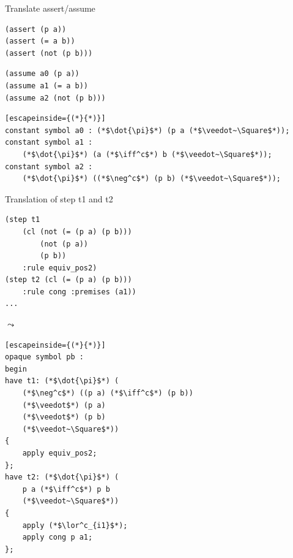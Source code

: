 \documentclass[aspectratio=169,xcolor={dvipsnames}]{beamer}
\begin{document}
\begin{frame}[fragile]{Translate assert/assume}
\noindent\begin{minipage}{.40\textwidth}
\begin{verbatim}
(assert (p a))
(assert (= a b))
(assert (not (p b)))
\end{verbatim}
\end{minipage}
\newline
\noindent\begin{minipage}{.40\textwidth}
\begin{verbatim}
(assume a0 (p a))
(assume a1 (= a b))
(assume a2 (not (p b)))
\end{verbatim}
\end{minipage}
\hfill\begin{minipage}{.55\textwidth}
\begin{lstlisting}[escapeinside={(*}{*)}]
constant symbol a0 : (*$\dot{\pi}$*) (p a (*$\veedot~\Square$*));
constant symbol a1 :
    (*$\dot{\pi}$*) (a (*$\iff^c$*) b (*$\veedot~\Square$*));
constant symbol a2 :
    (*$\dot{\pi}$*) ((*$\neg^c$*) (p b) (*$\veedot~\Square$*));
\end{lstlisting}
\end{minipage}
\end{frame}

\begin{frame}[fragile]{Translation of step t1 and t2}
\noindent\begin{minipage}{.45\textwidth}
\begin{verbatim}
(step t1
    (cl (not (= (p a) (p b)))
        (not (p a))
        (p b))
    :rule equiv_pos2)
(step t2 (cl (= (p a) (p b)))
    :rule cong :premises (a1))
...
\end{verbatim}
\end{minipage}
$\leadsto$\hfill \begin{minipage}{.45\textwidth}
\begin{lstlisting}[escapeinside={(*}{*)}]
opaque symbol pb : 
begin
have t1: (*$\dot{\pi}$*) (
    (*$\neg^c$*) ((p a) (*$\iff^c$*) (p b))
    (*$\veedot$*) (p a)
    (*$\veedot$*) (p b)
    (*$\veedot~\Square$*))
{
    apply equiv_pos2;
};
have t2: (*$\dot{\pi}$*) (
    p a (*$\iff^c$*) p b
    (*$\veedot~\Square$*))
{
    apply (*$\lor^c_{i1}$*);
    apply cong p a1;
};
\end{lstlisting}
\end{minipage}
\end{frame}
\end{document}
